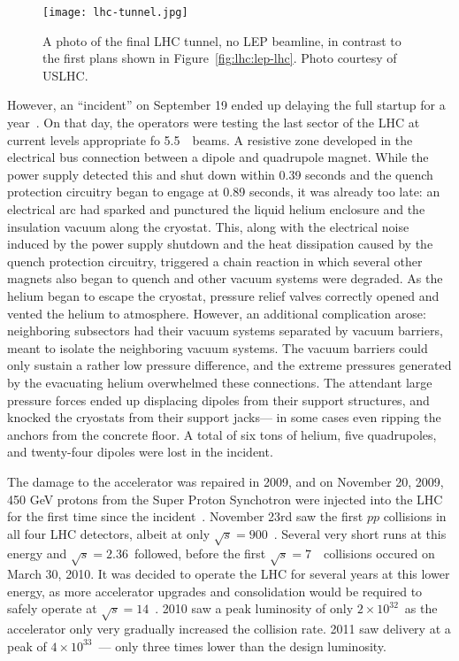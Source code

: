
\begin{figure}
\centering
\texttt{[image: lhc-tunnel.jpg]}
\caption{A photo of the final LHC tunnel, no LEP beamline, in contrast to the first plans shown in Figure~\ref{fig:lhc:lep-lhc}. Photo courtesy of USLHC.}
\label{fig:lhc:lhc-tunnel}
\end{figure}


However, an ``incident'' on September 19 ended up delaying the full startup for a year~\cite{Incident}. On that day, the operators were testing the last sector of the LHC at current levels appropriate fo 5.5~\TeV~beams. A resistive zone developed in the electrical bus connection between a dipole and quadrupole magnet. While the power supply detected this and shut down within 0.39 seconds and the quench protection circuitry began to engage at 0.89 seconds, it was already too late: an electrical arc had sparked and punctured the liquid helium enclosure and the insulation vacuum along the cryostat. This, along with the electrical noise induced by the power supply shutdown and the heat dissipation caused by the quench protection circuitry, triggered a chain reaction in which several other magnets also began to quench and other vacuum systems were degraded. As the helium began to escape the cryostat, pressure relief valves correctly opened and vented the helium to atmosphere. However, an additional complication arose: neighboring subsectors had their vacuum systems separated by vacuum barriers, meant to isolate the neighboring vacuum systems. The vacuum barriers could only sustain a rather low pressure difference, and the extreme pressures generated by the evacuating helium overwhelmed these connections. The attendant large pressure forces ended up displacing dipoles from their support structures, and knocked the cryostats from their support jacks--- in some cases even ripping the anchors from the concrete floor. A total of six tons of helium, five quadrupoles, and twenty-four dipoles were lost in the incident. 

The damage to the accelerator was repaired in 2009, and on November 20, 2009, 450 GeV protons from the Super Proton Synchotron were injected into the LHC for the first time since the incident~\cite{LHCWeb}. November 23rd saw the first $pp$ collisions in all four LHC detectors, albeit at only $\sqrt{s} = 900$~\GeV. Several very short runs at this energy and $\sqrt{s} = 2.36$~\TeV followed, before the first $\sqrt{s} = 7$~\TeV~collisions occured on March 30, 2010. It was decided to operate the LHC for several years at this lower energy, as more accelerator upgrades and consolidation would be required to safely operate at $\sqrt{s} = 14$~\TeV. 2010 saw a peak luminosity of only $2\times10^{32}$~\lumirate as the accelerator only very gradually increased the collision rate. 2011 saw delivery at a peak of $4 \times 10^{33}$~\lumirate--- only three times lower than the design luminosity.

